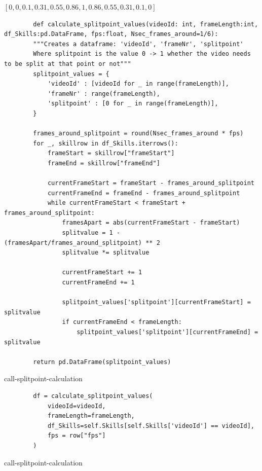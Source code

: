 \([0, 0, 0.1, 0.31, 0.55, 0.86, 1, 0.86, 0.55, 0.31, 0.1, 0]\)

\begin{listing}
    \begin{verbatim}
        def calculate_splitpoint_values(videoId: int, frameLength:int, df_Skills:pd.DataFrame, fps:float, Nsec_frames_around=1/6):
        """Creates a dataframe: 'videoId', 'frameNr', 'splitpoint'
        Where splitpoint is the value 0 -> 1 whether the video needs to be split at that point or not"""
        splitpoint_values = {
            'videoId' : [videoId for _ in range(frameLength)],
            'frameNr' : range(frameLength),
            'splitpoint' : [0 for _ in range(frameLength)],
        }

        frames_around_splitpoint = round(Nsec_frames_around * fps)
        for _, skillrow in df_Skills.iterrows():
            frameStart = skillrow["frameStart"]
            frameEnd = skillrow["frameEnd"]

            currentFrameStart = frameStart - frames_around_splitpoint
            currentFrameEnd = frameEnd - frames_around_splitpoint
            while currentFrameStart < frameStart + frames_around_splitpoint:
                framesApart = abs(currentFrameStart - frameStart)
                splitvalue = 1 - (framesApart/frames_around_splitpoint) ** 2
                splitvalue *= splitvalue

                currentFrameStart += 1
                currentFrameEnd += 1

                splitpoint_values['splitpoint'][currentFrameStart] = splitvalue
                if currentFrameEnd < frameLength:
                    splitpoint_values['splitpoint'][currentFrameEnd] = splitvalue

        return pd.DataFrame(splitpoint_values)
    \end{verbatim}
    \caption[call-splitpoint-calculation]{call-splitpoint-calculation}
    \label{code:calculate-splitpoint-values}
\end{listing}


\begin{listing}
    \begin{verbatim}
        df = calculate_splitpoint_values(
            videoId=videoId,
            frameLength=frameLength,
            df_Skills=self.Skills[self.Skills['videoId'] == videoId],
            fps = row["fps"]
        )
    \end{verbatim}
    \caption[call-splitpoint-calculation]{call-splitpoint-calculation}
    \label{code:call-splitpoint-calculation}
\end{listing}


